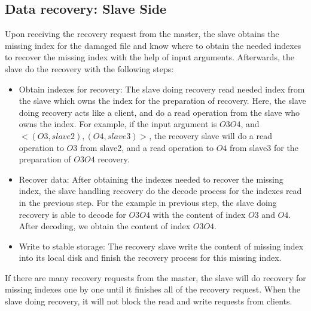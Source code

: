 \documentclass[conference]{IEEEtran}
\begin{document}
\subsection{Data recovery: Slave Side}
Upon receiving the recovery request from the master, the slave obtains the missing index for the damaged file and know where to obtain the needed indexes to recover the missing index with the help of input arguments. Afterwards, the slave do the recovery with the following steps:
\begin{itemize}
\item Obtain indexes for recovery: The  slave doing recovery read needed index from the slave which owns the index for the preparation of recovery. Here, the  slave doing recovery acts like a client, and do a read operation from the slave who owns the index. For example, if the input argument is $O3O4$, and $<(O3,slave2),(O4,slave3)>$, the recovery slave will do a read operation to $O3$ from slave2, and a read operation to $O4$ from slave3 for the preparation of  $O3O4$ recovery.
\item Recover data: After obtaining the indexes needed to recover the missing index, the slave handling recovery do the decode process for the indexes read in the previous step. For the example in previous step, the  slave doing recovery is able to  decode for $O3O4$ with the content of index $O3$ and $O4$. After decoding, we obtain the content of index $O3O4$.
\item Write to stable storage: The recovery slave write the content of missing index into its local disk and finish the recovery process for this missing index.
\end{itemize}
If there are many recovery requests from the master, the slave will do recovery for missing indexes one by one until it finishes all of the recovery request. When the slave doing recovery, it will not block the read and write requests from clients.
\end{document}
